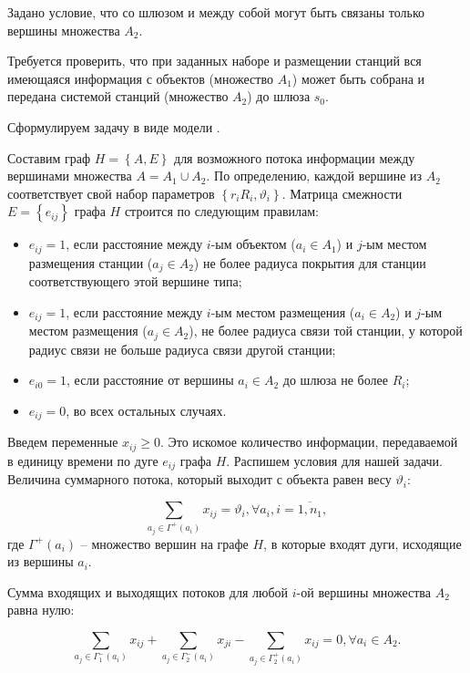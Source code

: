 Задано условие, что со шлюзом и между собой могут быть связаны только вершины множества $A_2$.

Требуется проверить, что при заданных наборе и размещении станций вся имеющаяся информация с объектов (множество $A_1$) может быть собрана и передана системой станций (множество $A_2$) до шлюза $s_0$.

Сформулируем задачу в виде модели .

Составим граф $ H = \left\{A,E \right\} $ для возможного потока информации между вершинами множества $ A = A_1 \cup A_2 $. По определению, каждой вершине из $ A_2 $ соответствует свой набор параметров $\left\{ r_i  R_i, \vartheta_i \right\} $.
Матрица смежности $E = \left\{ e_{ij} \right\}$ графа $H$ строится по следующим правилам:

\begin{itemize}
    \item $e_{ij} = 1$, если расстояние между $i$-ым объектом ($a_i \in A_1$) и $j$-ым местом размещения станции ($a_j \in A_2$) не более радиуса покрытия для станции соответствующего этой вершине типа; 
    \item $e_{ij} = 1$, если расстояние между $i$-ым местом размещения ($a_i \in A_2$) и $j$-ым местом размещения  ($a_j \in A_2$), не более радиуса связи той станции, у которой радиус связи не больше радиуса связи другой станции;
    \item $e_{i0} = 1$, если расстояние от вершины $a_i \in A_2$ до шлюза не более $R_i$;
    \item $e_{ij} = 0$, во всех остальных случаях.
\end{itemize}

Введем переменные $x_{ij} \geqslant 0$. Это искомое количество информации, передаваемой в единицу времени по дуге $e_{ij}$ графа $H$.
Распишем условия для нашей задачи.
Величина суммарного потока, который выходит с объекта равен весу $\vartheta_i$:

\begin{equation}\label{eq:part2_1.1}
    \sum_{a_j \in \Gamma^+(a_i)} x_{ij} = \vartheta_i, \forall a_i, i=\overline{1, n_1},
\end{equation}
где $\Gamma^+(a_i)$ – множество вершин на графе $H$, в которые входят дуги, исходящие из вершины $a_i$. 

Сумма входящих и выходящих потоков для любой $i$-ой вершины множества $A_2$ равна нулю:

\begin{equation}\label{eq:part2_1.2}
    \sum_{a_j \in \Gamma_1^-(a_i)} x_{ij} + \sum_{a_j \in \Gamma_2^-(a_i)} x_{ji} -  \sum_{a_j \in \Gamma_2^+(a_i)} x_{ij} =0 ,\forall a_i \in A_2. 
\end{equation}

